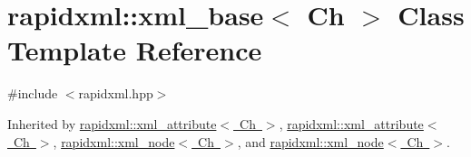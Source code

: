 \hypertarget{classrapidxml_1_1xml__base}{}\section{rapidxml\+:\+:xml\+\_\+base$<$ Ch $>$ Class Template Reference}
\label{classrapidxml_1_1xml__base}


{\ttfamily \#include $<$rapidxml.\+hpp$>$}



Inherited by \mbox{\hyperlink{classrapidxml_1_1xml__attribute}{rapidxml\+::xml\+\_\+attribute$<$ Ch $>$}}, \mbox{\hyperlink{classrapidxml_1_1xml__attribute}{rapidxml\+::xml\+\_\+attribute$<$ Ch $>$}}, \mbox{\hyperlink{classrapidxml_1_1xml__node}{rapidxml\+::xml\+\_\+node$<$ Ch $>$}}, and \mbox{\hyperlink{classrapidxml_1_1xml__node}{rapidxml\+::xml\+\_\+node$<$ Ch $>$}}.

